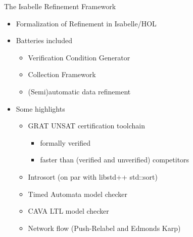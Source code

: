 \documentclass[fleqn]{beamer}
\begin{document}
\begin{frame}{The Isabelle Refinement Framework}
  \begin{itemize}
   \item<+-> Formalization of Refinement in Isabelle/HOL
   \item<+-> Batteries included
    \begin{itemize}
     \item<+-> Verification Condition Generator
     \item<+-> Collection Framework
     \item<+-> (Semi)automatic data refinement
    \end{itemize}
   \item<+-> Some highlights
    \begin{itemize}
     \item<+-> GRAT UNSAT certification toolchain
      \begin{itemize}
       \item formally verified
       \item faster than (verified and unverified) competitors
      \end{itemize}
     \item<+-> Introsort (on par with libstd++ std::sort)
     \item<+-> Timed Automata model checker
     \item<+-> CAVA LTL model checker
     \item<+-> Network flow (Push-Relabel and Edmonds Karp)


    \end{itemize}
  \end{itemize}
\end{frame}
\end{document}
